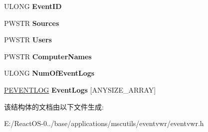 \begin{DoxyCompactItemize}
U\+L\+O\+NG {\bfseries Event\+ID}
\item 
\mbox{\label{struct___e_v_e_n_t_l_o_g_f_i_l_t_e_r_a9b6545bc9fd5d9701a362ad67fb66622}} 
P\+W\+S\+TR {\bfseries Sources}
\item 
\mbox{\label{struct___e_v_e_n_t_l_o_g_f_i_l_t_e_r_a500cb7542b0cf2d89021390007ff4a1f}} 
P\+W\+S\+TR {\bfseries Users}
\item 
\mbox{\label{struct___e_v_e_n_t_l_o_g_f_i_l_t_e_r_a91fb997061950afa08fad1eb1686426d}} 
P\+W\+S\+TR {\bfseries Computer\+Names}
\item 
\mbox{\label{struct___e_v_e_n_t_l_o_g_f_i_l_t_e_r_a1187420047cdeda67d6bde6358d84f6b}} 
U\+L\+O\+NG {\bfseries Num\+Of\+Event\+Logs}
\item 
\mbox{\label{struct___e_v_e_n_t_l_o_g_f_i_l_t_e_r_a012f78f6d48078b0a7d745285f529100}} 
\hyperlink{struct___e_v_e_n_t_l_o_g}{P\+E\+V\+E\+N\+T\+L\+OG} {\bfseries Event\+Logs} \mbox{[}A\+N\+Y\+S\+I\+Z\+E\+\_\+\+A\+R\+R\+AY\mbox{]}
\end{DoxyCompactItemize}


该结构体的文档由以下文件生成\+:\begin{DoxyCompactItemize}
\item 
E\+:/\+React\+O\+S-\/0../base/applications/mscutils/eventvwr/eventvwr.\+h\end{DoxyCompactItemize}
